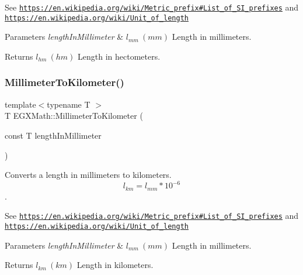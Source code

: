 See \href{https://en.wikipedia.org/wiki/Metric_prefix#List_of_SI_prefixes}{\tt https\+://en.\+wikipedia.\+org/wiki/\+Metric\+\_\+prefix\#\+List\+\_\+of\+\_\+\+S\+I\+\_\+prefixes} and \href{https://en.wikipedia.org/wiki/Unit_of_length}{\tt https\+://en.\+wikipedia.\+org/wiki/\+Unit\+\_\+of\+\_\+length} 
\begin{DoxyParams}{Parameters}
{\em length\+In\+Millimeter} & $ l_{mm}\ (mm)$ Length in millimeters. \\
\hline
\end{DoxyParams}
\begin{DoxyReturn}{Returns}
$ l_{hm}\ (hm)$ Length in hectometers. 
\end{DoxyReturn}
\mbox{\label{group___e_g_x_math-_conversions-_length_conversions-_millimeter-_s_i_ga1c5b03f2d0745187350584f77f406f13}} 
\subsubsection{\texorpdfstring{Millimeter\+To\+Kilometer()}{MillimeterToKilometer()}}
{\footnotesize\ttfamily template$<$typename T $>$ \\
T E\+G\+X\+Math\+::\+Millimeter\+To\+Kilometer (\begin{DoxyParamCaption}\item[{const T}]{length\+In\+Millimeter }\end{DoxyParamCaption})}



Converts a length in millimeters to kilometers. \[ l_{km}=l_{mm} * 10^{-6} \]. 

See \href{https://en.wikipedia.org/wiki/Metric_prefix#List_of_SI_prefixes}{\tt https\+://en.\+wikipedia.\+org/wiki/\+Metric\+\_\+prefix\#\+List\+\_\+of\+\_\+\+S\+I\+\_\+prefixes} and \href{https://en.wikipedia.org/wiki/Unit_of_length}{\tt https\+://en.\+wikipedia.\+org/wiki/\+Unit\+\_\+of\+\_\+length} 
\begin{DoxyParams}{Parameters}
{\em length\+In\+Millimeter} & $ l_{mm}\ (mm)$ Length in millimeters. \\
\hline
\end{DoxyParams}
\begin{DoxyReturn}{Returns}
$ l_{km}\ (km)$ Length in kilometers. 
\end{DoxyReturn}
\mbox{\label{group___e_g_x_math-_conversions-_length_conversions-_millimeter-_s_i_ga2e4c24dcd2559aebefe78e13fbd0e394}} 
